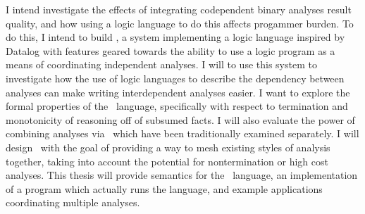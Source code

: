 {\fontsize{10}{12}\selectfont
I intend investigate the effects of integrating codependent binary analyses result quality, and how using a logic language to do this affects progammer burden.
To do this, I intend to build \sysname, a system implementing a logic language inspired by Datalog with features geared towards the ability to use a logic program as a means of coordinating independent analyses.
I will to use this system to investigate how the use of logic languages to describe the dependency between analyses can make writing interdependent analyses easier.
I want to explore the formal properties of the \sysname\ language, specifically with respect to termination and monotonicity of reasoning off of subsumed facts.
I will also evaluate the power of combining analyses via \sysname\ which have been traditionally examined separately.
I will design \sysname\ with the goal of providing a way to mesh existing styles of analysis together, taking into account the potential for nontermination or high cost analyses.
This thesis will provide semantics for the \sysname\ language, an implementation of a program which actually runs the language, and example applications coordinating multiple analyses.
}
